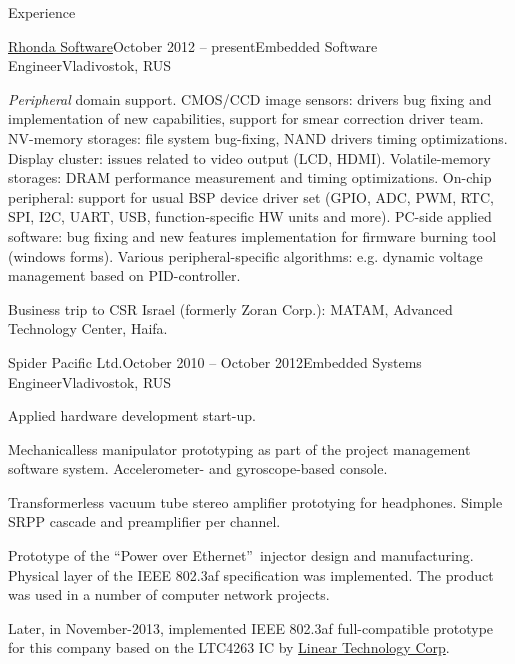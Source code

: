 \documentclass{template}
\begin{document}
\begin{rSection}{Experience}
\begin{rCompany}{\href{http://www.rhondasoftware.com}{Rhonda Software}}{October 2012 -- present}{Embedded Software Engineer}{Vladivostok, RUS}
\item \textit{Peripheral} domain support. CMOS/CCD image sensors: drivers bug fixing and implementation of new capabilities, support for smear correction driver team. NV-memory storages: file system bug-fixing, NAND drivers timing optimizations. Display cluster: issues related to video output (LCD, HDMI). Volatile-memory storages: DRAM performance measurement and timing optimizations. On-chip peripheral: support for usual BSP device driver set (GPIO, ADC, PWM, RTC, SPI, I2C, UART, USB, function-specific HW units and more). PC-side applied software: bug fixing and new features implementation for firmware burning tool (windows forms). Various peripheral-specific algorithms: e.g. dynamic voltage management based on PID-controller.
\item Business trip to CSR Israel (formerly Zoran Corp.): MATAM, Advanced Technology Center, Haifa. \newline
\end{rCompany}
\begin{rCompany}{Spider Pacific Ltd.}{October 2010 -- October 2012}{Embedded Systems Engineer}{Vladivostok, RUS}
\item Applied hardware development start-up.
\item Mechanicalless manipulator prototyping as part of the project management software system. \newline Accelerometer- and gyroscope-based console.
\item Transformerless vacuum tube stereo amplifier prototying for headphones. \newline Simple SRPP cascade and preamplifier per channel.
\item Prototype of the \textquotedblleft Power over Ethernet\textquotedblright \ injector design and manufacturing. Physical layer of the IEEE 802.3af specification was implemented. The product was used in a number of computer network projects.
\item Later, in November-2013, implemented IEEE 802.3af full-compatible prototype for this company based on the LTC4263 IC by \href{http://www.linear.com}{Linear Technology Corp}.
\end{rCompany}
\end{rSection}

\end{document}
